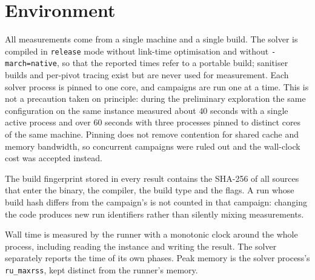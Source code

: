 \section{Environment}
\label{sec:environment}


All measurements come from a single machine and a single build. The solver is
compiled in \texttt{release} mode without link-time optimisation and without
\texttt{-march=native}, so that the reported times refer to a portable build;
sanitiser builds and per-pivot tracing exist but are never used for
measurement. Each solver process is pinned to one core, and campaigns are run one at a time.
This is not a precaution taken on principle: during the preliminary exploration
the same configuration on the same instance measured about $40$ seconds with a
single active process and over $60$ seconds with three processes pinned to
distinct cores of the same machine. Pinning does not remove contention for
shared cache and memory bandwidth, so concurrent campaigns were ruled out and
the wall-clock cost was accepted instead.

The build fingerprint stored in every result contains the SHA-256 of all sources
that enter the binary, the compiler, the build type and the flags. A run whose
build hash differs from the campaign's is not counted in that campaign: changing
the code produces new run identifiers rather than silently mixing measurements.

Wall time is measured by the runner with a monotonic clock around the whole
process, including reading the instance and writing the result. The solver
separately reports the time of its own phases. Peak memory is the solver
process's \texttt{ru\_maxrss}, kept distinct from the runner's memory.
